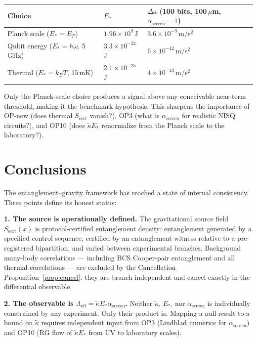 \documentclass[11pt]{article}
\theoremstyle{plain}
\theoremstyle{definition}
\theoremstyle{remark}
\begin{document}
\begin{center}\small
\begin{tabular}{@{}p{4.5cm}p{2.5cm}p{4cm}@{}}
\toprule
Choice & $E_*$ & $\Delta a$ (100 bits, 100\,$\mu$m, $\alpha_{\mathrm{screen}}=1$) \\
\midrule
Planck scale ($E_* = E_P$) & $1.96\times10^9$\,J & $3.6\times10^{-9}$\,m/s$^2$ \\
Qubit energy ($E_* = \hbar\omega$, 5\,GHz) & $3.3\times10^{-24}$\,J & $6\times10^{-42}$\,m/s$^2$ \\
Thermal ($E_* = k_BT$, 15\,mK) & $2.1\times10^{-25}$\,J & $4\times10^{-43}$\,m/s$^2$ \\
\bottomrule
\end{tabular}
\end{center}

Only the Planck-scale choice produces a signal above any conceivable near-term threshold,
making it the benchmark hypothesis.  This sharpens the importance of OP-new (does thermal
$S_{\mathrm{cert}}$ vanish?), OP3 (what is $\alpha_{\mathrm{screen}}$ for realistic NISQ
circuits?), and OP10 (does $\tilde{\kappa}E_*$ renormalize from the Planck scale to the
laboratory?).


\section{Conclusions}

The entanglement--gravity framework has reached a state of internal consistency.
Three points define its honest status:

\textbf{1. The source is operationally defined.}
The gravitational source field $S_{\mathrm{cert}}(x)$ is protocol-certified
entanglement density: entanglement generated by a specified control sequence,
certified by an entanglement witness relative to a pre-registered bipartition,
and varied between experimental branches.  Background many-body correlations
--- including BCS Cooper-pair entanglement and all thermal correlations ---
are excluded by the Cancellation Proposition~\ref{prop:cancel}: they are
branch-independent and cancel exactly in the differential observable.

\textbf{2. The observable is $\Lambda_{\mathrm{eff}} = \tilde{\kappa}E_*\alpha_{\mathrm{screen}}$.}
Neither $\tilde{\kappa}$, $E_*$, nor $\alpha_{\mathrm{screen}}$ is individually constrained
by any experiment.  Only their product is.  Mapping a null result to a bound on $\tilde{\kappa}$
requires independent input from OP3 (Lindblad numerics for $\alpha_{\mathrm{screen}}$) and
OP10 (RG flow of $\tilde{\kappa}E_*$ from UV to laboratory scales).
\end{document}
